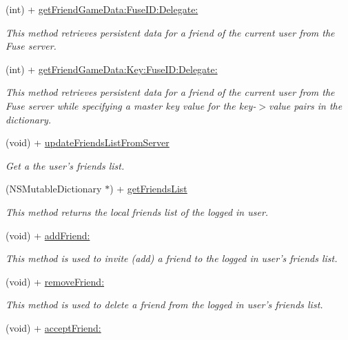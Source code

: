 \begin{DoxyCompactItemize}
(int) + \hyperlink{interface_fuse_a_p_i_a74a0868cdaa574c3f4ad1dec90550935}{get\+Friend\+Game\+Data\+:\+Fuse\+I\+D\+:\+Delegate\+:}
\begin{DoxyCompactList}\small\item\em This method retrieves persistent data for a friend of the current user from the Fuse server. \end{DoxyCompactList}\item 
(int) + \hyperlink{interface_fuse_a_p_i_a4bf35443872c59c1b514d3e0ebbff7a8}{get\+Friend\+Game\+Data\+:\+Key\+:\+Fuse\+I\+D\+:\+Delegate\+:}
\begin{DoxyCompactList}\small\item\em This method retrieves persistent data for a friend of the current user from the Fuse server while specifying a master key value for the key-\/$>$value pairs in the dictionary. \end{DoxyCompactList}\item 
(void) + \hyperlink{interface_fuse_a_p_i_a11a92658dca5be9d79ca19a66bafb91e}{update\+Friends\+List\+From\+Server}
\begin{DoxyCompactList}\small\item\em Get a the user's friends list. \end{DoxyCompactList}\item 
(N\+S\+Mutable\+Dictionary $\ast$) + \hyperlink{interface_fuse_a_p_i_a31d609ce39be3e6eda04fd32d8036e95}{get\+Friends\+List}
\begin{DoxyCompactList}\small\item\em This method returns the local friends list of the logged in user. \end{DoxyCompactList}\item 
(void) + \hyperlink{interface_fuse_a_p_i_a92b5888d1e5dafe2ab2a76fda44be4d8}{add\+Friend\+:}
\begin{DoxyCompactList}\small\item\em This method is used to invite (add) a friend to the logged in user's friends list. \end{DoxyCompactList}\item 
(void) + \hyperlink{interface_fuse_a_p_i_a1556fd18ab2ae7f062c9d2ebbe2498fc}{remove\+Friend\+:}
\begin{DoxyCompactList}\small\item\em This method is used to delete a friend from the logged in user's friends list. \end{DoxyCompactList}\item 
(void) + \hyperlink{interface_fuse_a_p_i_ae93cfa17f5b00ab1d28c53a8577c1af0}{accept\+Friend\+:}

\end{DoxyCompactItemize}
